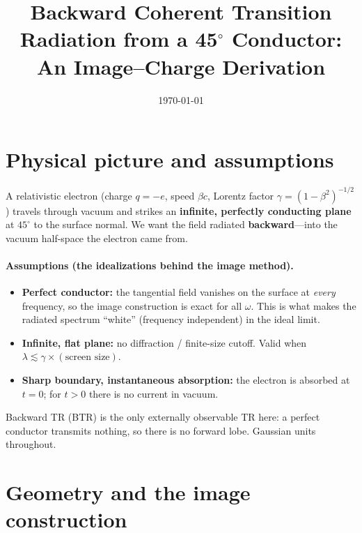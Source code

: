 \documentclass[11pt]{article}
\title{Backward Coherent Transition Radiation from a 45$^\circ$ Conductor:\\
An Image--Charge Derivation}
\author{}
\date{\today}
\begin{document}
\maketitle

\section{Physical picture and assumptions}

A relativistic electron (charge $q=-e$, speed $\beta c$, Lorentz factor
$\gamma=(1-\beta^2)^{-1/2}$) travels through vacuum and strikes an
\textbf{infinite, perfectly conducting plane} at $45^\circ$ to the surface
normal. We want the field radiated \textbf{backward}---into the vacuum
half-space the electron came from.

\paragraph{Assumptions (the idealizations behind the image method).}
\begin{itemize}
  \item \textbf{Perfect conductor:} the tangential field vanishes on the
        surface at \emph{every} frequency, so the image construction is exact
        for all $\omega$. This is what makes the radiated spectrum ``white''
        (frequency independent) in the ideal limit.
  \item \textbf{Infinite, flat plane:} no diffraction / finite-size cutoff.
        Valid when $\lambda \lesssim \gamma\times(\text{screen size})$.
  \item \textbf{Sharp boundary, instantaneous absorption:} the electron is
        absorbed at $t=0$; for $t>0$ there is no current in vacuum.
\end{itemize}
Backward TR (BTR) is the only externally observable TR here: a perfect
conductor transmits nothing, so there is no forward lobe. Gaussian units
throughout.

\section{Geometry and the image construction}
\end{document}
